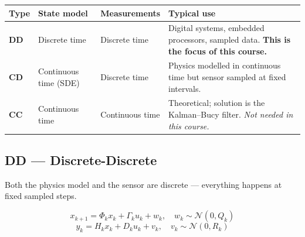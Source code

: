\documentclass[12pt, a4paper]{article}
\begin{document}
\begin{center}
\renewcommand{\arraystretch}{1.6}
\begin{tabular}{p{1.8cm} p{3cm} p{3cm} p{6.5cm}}
  \toprule
  \textbf{Type} & \textbf{State model} & \textbf{Measurements} &
  \textbf{Typical use} \\
  \midrule
  \textbf{DD} &
    Discrete time & Discrete time &
    Digital systems, embedded processors, sampled data.
    \textbf{This is the focus of this course.} \\
  \textbf{CD} &
    Continuous time (SDE) & Discrete time &
    Physics modelled in continuous time but sensor sampled
    at fixed intervals. \\
  \textbf{CC} &
    Continuous time & Continuous time &
    Theoretical; solution is the Kalman--Bucy filter.
    \emph{Not needed in this course.} \\
  \bottomrule
\end{tabular}
\end{center}
\clearpage
\subsection*{DD --- Discrete-Discrete}

Both the physics model and the sensor are discrete ---
everything happens at fixed sampled steps.

\[
  x_{k+1} = \Phi_k x_k + \Gamma_k u_k + w_k,
  \quad w_k \sim \mathcal{N}(0, Q_k)
\]
\[
  y_k = H_k x_k + D_k u_k + v_k,
  \quad v_k \sim \mathcal{N}(0, R_k)
\]
\end{document}
